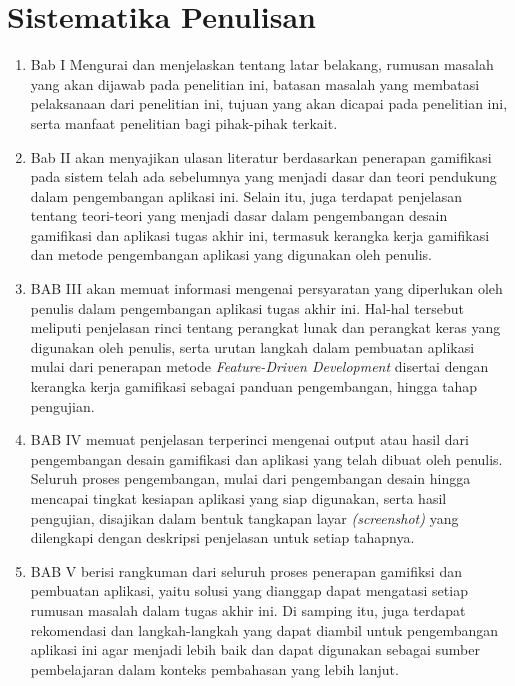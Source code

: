 \section{Sistematika Penulisan}
\begin{enumerate}
	\item Bab I Mengurai dan menjelaskan tentang latar belakang, rumusan 
	masalah yang akan dijawab pada penelitian ini, batasan masalah yang membatasi 
	pelaksanaan dari penelitian ini, tujuan yang akan dicapai pada penelitian ini, serta manfaat 
	penelitian bagi pihak-pihak terkait.
	\item Bab II akan menyajikan ulasan literatur berdasarkan penerapan gamifikasi pada sistem telah ada sebelumnya yang menjadi dasar dan teori pendukung dalam pengembangan aplikasi ini.
	Selain itu, juga terdapat penjelasan tentang teori-teori yang menjadi dasar dalam pengembangan desain gamifikasi dan aplikasi tugas akhir ini, 
	termasuk kerangka kerja gamifikasi dan metode pengembangan aplikasi yang digunakan oleh penulis.
	\item BAB III akan memuat informasi mengenai persyaratan yang diperlukan oleh penulis dalam pengembangan aplikasi tugas akhir ini.
	Hal-hal tersebut meliputi penjelasan rinci tentang perangkat lunak dan perangkat keras yang digunakan oleh penulis, 
	serta urutan langkah dalam pembuatan aplikasi mulai dari penerapan metode \textit{Feature-Driven Development} disertai dengan kerangka kerja gamifikasi sebagai panduan pengembangan, hingga tahap pengujian.
	\item BAB IV memuat penjelasan terperinci mengenai output atau hasil dari pengembangan desain gamifikasi dan aplikasi yang telah dibuat oleh penulis.
	Seluruh proses pengembangan, mulai dari pengembangan desain hingga mencapai tingkat kesiapan aplikasi yang siap digunakan, serta hasil pengujian,
	disajikan dalam bentuk tangkapan layar \textit{(screenshot)} yang dilengkapi dengan deskripsi penjelasan untuk setiap tahapnya.
	\item BAB V berisi rangkuman dari seluruh proses penerapan gamifiksi dan pembuatan aplikasi, yaitu solusi yang dianggap dapat mengatasi setiap rumusan masalah dalam tugas akhir ini.
	Di samping itu, juga terdapat rekomendasi dan langkah-langkah yang dapat diambil untuk pengembangan aplikasi ini agar menjadi lebih baik dan dapat digunakan sebagai sumber pembelajaran dalam konteks pembahasan yang lebih lanjut.
\end{enumerate}

